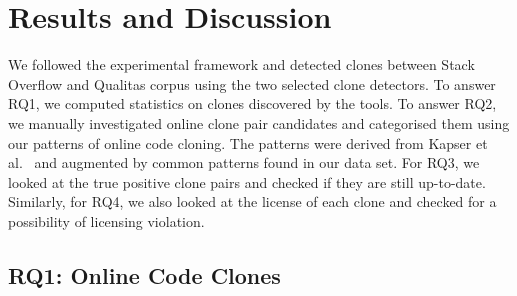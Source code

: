 \documentclass[sigconf,review, anonymous]{acmart}
\begin{document}
\section{Results and Discussion}

We followed the experimental framework and detected clones between Stack Overflow and Qualitas corpus using the two selected clone detectors. To answer RQ1, we computed statistics on clones discovered by the tools. To answer RQ2, we manually investigated online clone pair candidates and categorised them using our patterns of online code cloning. The patterns were derived from Kapser et al.~\cite{Kapser2003} and augmented by common patterns found in our data set. For RQ3, we looked at the true positive clone pairs and checked if they are still up-to-date. Similarly, for RQ4, we also looked at the license of each clone and checked for a possibility of licensing violation.

\subsection{RQ1: Online Code Clones} 

\begin{table}
	\centering
	\caption{Statistics of online clones reported by Simian (\textit{S}) and NiCad (\textit{N}) with default (\textit{D}) and EvaClone (\textit{E}) configurations}
	\label{tab:raw_stats}
	\small
\end{table}
\end{document}
